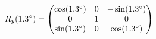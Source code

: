 \documentclass[preview]{standalone}
\begin{document}
\begin{align*}
\special{dvisvgm:raw <g id='unique000'>}R_y(1.3^\circ) = \begin{pmatrix} \cos(1.3^\circ) & 0 & -\sin(1.3^\circ) \\ 0 & 1 & 0 \\ \sin(1.3^\circ) & 0 & \cos(1.3^\circ) \end{pmatrix}\special{dvisvgm:raw </g>}
\end{align*}
\end{document}
